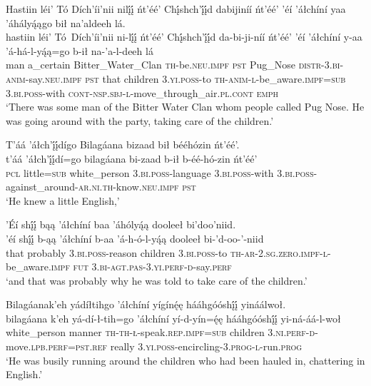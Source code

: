 \ea\label{ex:text1-20-2}
Hastiin léi’ Tó Dích’íi’nii nilį́į́ ńt’éé’ Chį́shch’į́į́d dabijiníí ńt’éé’ ’éí ’áłchíní yaa ’áhályą́ągo bił na’aldeeh lá.\\
\gll hastiin	léi’	Tó~{Dích’íi’nii}	ni-lį́į́	ńt’éé’	Chį́shch’į́į́d	da-bi-ji-níí	ńt’éé’	’éí	’áłchíní	y-aa	’á-há-l-yą́ą=go	b-ił	na-’a-l-deeh	lá\\
     man	a\_certain	Bitter\_Water\_Clan	\textsc{th}-be.\textsc{neu}.\textsc{impf}	\textsc{pst}	Pug\_Nose	\textsc{distr}-3.\textsc{bi}-\textsc{anim}-say.\textsc{neu}.\textsc{impf}	\textsc{pst}	that	children	3.\textsc{yi}.\textsc{poss}-to	\textsc{th}-\textsc{anim}-\textsc{l}-be\_aware.\textsc{impf}=\textsc{sub}	3.\textsc{bi}.\textsc{poss}-with	\textsc{cont}-\textsc{nsp}.\textsc{sbj}-\textsc{l}-move\_through\_air.\textsc{pl}.\textsc{cont}	\textsc{emph}\\
\glt `There was some man of the Bitter Water Clan whom people called Pug Nose. He was going around with the party, taking care of the children.'
\z

\ea\label{ex:text1-20-3}
T’áá ’áłch’į́į́dígo Bilagáana bizaad bił bééhózin ńt’éé’.\\
\gll t’áá	’áłch’į́į́dí=go	bilagáana	bi-zaad	b-ił	b-éé-hó-zin	ńt’éé’\\
     \textsc{pcl}	little=\textsc{sub}	white\_person	3.\textsc{bi}.\textsc{poss}-language	3.\textsc{bi}.\textsc{poss}-with	3.\textsc{bi}.\textsc{poss}-against\_around-\textsc{ar}.\textsc{ni}.\textsc{th}-know.\textsc{neu}.\textsc{impf}	\textsc{pst}\\
\glt `He knew a little English,'
\z

\newpage
\ea\label{ex:text1-20-4}
’Éí shį́į́ bąą ’áłchíní baa ’áhólyą́ą dooleeł bi’doo’niid.\\
\gll ’éí	shį́į́	b-ąą	’áłchíní	b-aa	’á-h-ó-l-yą́ą	dooleeł	bi-’d-oo-’-niid\\
     that	probably	3.\textsc{bi}.\textsc{poss}-reason	children	3.\textsc{bi}.\textsc{poss}-to	\textsc{th}-\textsc{ar}-2.\textsc{sg}.\textsc{zero}.\textsc{impf}-\textsc{l}-be\_aware.\textsc{impf}	\textsc{fut}	3.\textsc{bi}-\textsc{agt}.\textsc{pas}-3.\textsc{yi}.\textsc{perf}-\textsc{d}-say.\textsc{perf}\\
\glt `and that was probably why he was told to take care of the children.'
\z

\ea\label{ex:text1-20-5}
Bilagáanak’eh yádíłtihgo ’áłchíní yígínę́ę hááhgóóshį́į́ yináálwoł.\\
\gll bilagáana k’eh	yá-dí-ł-tih=go	’áłchíní	yí-d-yín=ę́ę	hááhgóóshį́į́	yi-ná-áá-l-woł\\
     white\_person manner	\textsc{th}-\textsc{th}-\textsc{ł}-speak.\textsc{rep}.\textsc{impf}=\textsc{sub}	children	3.\textsc{ni}.\textsc{perf}-\textsc{d}-move.\textsc{lpb}.\textsc{perf}=\textsc{pst}.\textsc{ref}	really	3.\textsc{yi}.\textsc{poss}-encircling-3.\textsc{prog}-\textsc{l}-run.\textsc{prog}\\
\glt `He was busily running around the children who had been hauled in, chattering in English.'
\z

